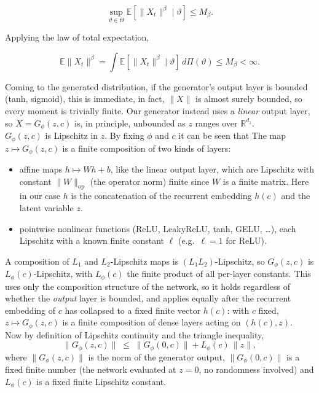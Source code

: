 \begin{appendices}
\[
\sup_{\vartheta\in\Theta}
\mathbb E
\left[
\|X_t\|^\beta
\mid
\vartheta
\right]
\le
M_\beta.
\]

Applying the law of total expectation,

\[
\mathbb E
\|X_t\|^\beta
=
\int
\mathbb E
[
\|X_t\|^\beta
\mid
\vartheta
]
\,d\Pi(\vartheta)
\le
M_\beta
<
\infty.
\]


\vspace{3cm}
Coming to the generated distribution,
if the generator's output layer is bounded (tanh, sigmoid), this is immediate, in fact, $\|X\|$ is almost surely bounded, 
so every moment is trivially finite. 
Our generator instead uses a \emph{linear} output layer, 
so $X=G_\phi(z,c)$ is, in principle, 
unbounded as $z$ ranges over $\mathbb{R}^{d_z}$.\\
$G_\phi(z,c)$ is Lipschitz in $z$. By fixing $\phi$ and $c$ it can be seen that
The map $z\mapsto G_\phi(z,c)$ is a finite composition of two kinds of layers:
\begin{itemize}
\item affine maps $h\mapsto Wh+b$, like the linear output layer,
which are Lipschitz with constant $\|W\|_{\mathrm{op}}$ (the operator norm) finite since $W$ is a finite matrix. Here in our case $h$ is the concatenation of the recurrent embedding $h(c)$ and the latent variable $z$.
\item pointwise nonlinear functions (ReLU, LeakyReLU, tanh, GELU, \ldots), each Lipschitz with a known finite constant $\ell$ (e.g.\ $\ell=1$ for ReLU).
\end{itemize}
A composition of $L_1$ and 
$L_2$-Lipschitz maps is $(L_1L_2)$-Lipschitz, 
so $G_\phi(z,c)$ is $L_\phi(c)$-Lipschitz, 
with $L_\phi(c)$ the finite product of all per-layer 
constants. 
This uses only the composition structure of 
the network, so it holds regardless of whether the 
\emph{output} layer is bounded, and applies equally 
after the recurrent embedding of $c$ has collapsed to a 
fixed finite vector $h(c)$: with $c$ fixed, 
$z\mapsto G_\phi(z,c)$ is a finite composition 
of dense layers acting on $(h(c),z)$.\\

Now by definition of Lipschitz continuity and the 
triangle inequality,
\[
\|G_\phi(z,c)\| \;\le\; \|G_\phi(0,c)\| + L_\phi(c)\,\|z\|,
\]
where $\|G_\phi(z,c)\|$ is the norm of the generator output, $\|G_\phi(0,c)\|$ is a fixed finite 
number (the network evaluated at $z=0$, no randomness 
involved) and $L_\phi(c)$ is a fixed finite 
Lipschitz constant.\\


\end{appendices}
